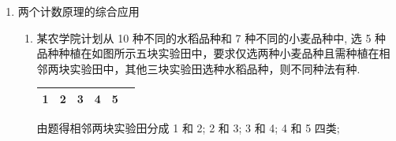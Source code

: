 \begin{enumerate}
\begin{enumerate}
        \item 用红、黄、蓝、白、黑五种颜色在“田”字型的 4 个小方格内涂色，每格涂一种颜色，相邻两格涂不同的颜色，则不同的涂色方法共有种.
        \begin{jieda}
            将“田”字型的 4 个小方格分别编号为 A, B, C, D，如下图所示:
            
            \begin{center}
            \begin{tabular}{|c|c|}
            \hline
            $A$ & $B$ \\
            \cline{1-2}
            $C$ & $D$ \\
            \cline{1-2}
            \hline
            \end{tabular}
            \end{center}
            
            根据题意, 将问题分成 4 步进行,
            
            第一步:涂方格 A，共有 5 种颜色选择，
            
            第二步:涂方格 B，需与 A 不同，共有 4 种颜色选择，
            
            第三步:涂方格C，若方格C与方格B颜色相同，只有 1 种选择；若方格C与方格B颜色不同，则有 3 种选择;
            
            第四步:涂方格 D，当方格 C 与方格 B 颜色相同，方格 D 有 4 种颜色选择；当方格 C 与方格 B 颜色不同， 方格 D 有 3 种颜色选择,
            
            因此可得不同的涂色方法共有 $5 \times  4 \times  \left( {1 \times  4 + 3 \times  3}\right)  = {260}$ 种.
        \end{jieda}
        
    \end{enumerate}
    
    \item 两个计数原理的综合应用
    \begin{enumerate}
        \item 某农学院计划从 10 种不同的水稻品种和 7 种不同的小麦品种中, 选 5 种品种种植在如图所示五块实验田中，要求仅选两种小麦品种且需种植在相邻两块实验田中，其他三块实验田选种水稻品种，则不同种法有种.
        
        \begin{center}
        \begin{tabular}{|c|c|c|c|c|c|}
        \hline
        1 & 2 & 3 & 4 & 5 & \phantom{X} \\
        \cline{1-6}
        \hline
        \end{tabular}
        \end{center}
        \begin{jieda}
            由题得相邻两块实验田分成 1 和 2; 2 和 3; 3 和 4; 4 和 5 四类;
            

\end{jieda}
\end{enumerate}
\end{enumerate}
